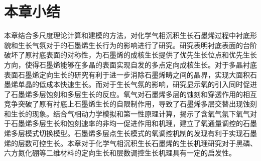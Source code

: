 \section{本章小结}
本章结合多尺度理论计算和建模的方法，对化学气相沉积生长石墨烯过程中衬底形貌和生长气氛对于的石墨烯生长行为的影响进行了研究。研究表明衬底表面的台阶破坏了原衬底表面的对称性，为石墨烯的成核生长提供了优先生长位点和优先生长方向，使得石墨烯能够在多晶的表面实现自发的多点定向成核生长。对于多晶衬底表面石墨烯定向生长的研究有利于进一步消除石墨烯畴之间的晶界，实现大面积石墨烯单晶的低成本快速生长。而对于生长气氛的影响，研究显示氧的引入同时促进了石墨烯多层蚀刻和多层生长的反应。氧气对石墨烯多层的蚀刻和穿透作用的相互竞争突破了原有衬底上石墨烯生长的自限制作用，导致了石墨烯多层交替出现蚀刻和生长的现象。结合气相动力学模拟和第一性原理计算，揭示了含氧气氛下氧气对于石墨烯多层生长和蚀刻速率的非均一促进作用和机理，建立了氧通量调控的石墨烯多层模式切换模型。石墨烯多层点生长模式的氧调控机制的发现有利于实现石墨烯的层数可控生长。本章对于化学气相沉积生长石墨烯的生长机理研究对于黑磷、六方氮化硼等二维材料的定向生长和层数调控生长机理具有一定的启发性。
